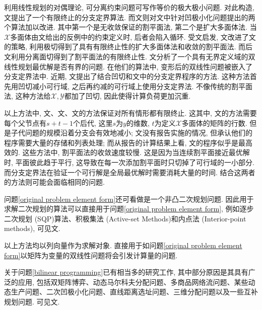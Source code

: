 \par 利用线性规划的对偶理论, 可分离约束问题可写作等价的极大极小问题. 对此构造, 文\cite{Falk1973}提出了一个有限终止的分支定界算法. 而文\cite{Gallo1977}则对文\cite{Tuy1964Concave}中针对凹极小化问题提出的两个算法加以改进. 其中第一个是无收敛保证的割平面法, 第二个是扩大多面体法. 当$\mathcal{X}$多面体由文\cite{Zwart1973Nonlinear}给出的反例中的约束定义时, 后者会陷入循环. 受文\cite{Gallo1977}启发, 文\cite{Vaish1976The,Vaish1977A}改进了文\cite{Tuy1964Concave}的策略, 利用极切得到了具有有限终止性的扩大多面体法和收敛的割平面法. 而后文\cite{Sherali1980}利用分离面切得到了割平面法的有限终止性. 文\cite{Audet1999}分析了一个具有无界定义域的双线性规划最优解是否有界的问题. 在他们的算法中, 变形后的双线性问题被嵌入了分支定界法中. 近期, 文\cite{Alarie2001COncavity}提出了结合凹切和文\cite{Audet1999}中的分支定界程序的方法. 这种方法首先用凹切减小可行域, 之后再约减的可行域上使用分支定界法. 不像传统的割平面法, 这种方法给$\mathcal{X},\mathcal{Y}$都加了凹切, 因此使得计算负荷更加沉重. 
\par 以上方法中, 文\cite{Falk1973}、文\cite{Vaish1976The}、文\cite{Sherali1980}的方法保证对所有情形都有限终止. 这其中, 文\cite{Falk1973}的方法需要每个父节点有$s+t-1$个后代, 这里$s$为$y$的维数, $t$为定义$\mathcal{X}$多面体的矩阵的行数. 但是子代问题的规模沿着分支会有效地减小; 文\cite{Vaish1976The}没有报告实施的情况, 但承认他们的程序需要大量的存储和列表处理; 而从报告的计算结果上看, 文\cite{Sherali1980}的程序似乎是最高效的. 这些方法中, 割平面法的收敛速度较慢. 这是因为当连续割平面接近最优解时, 平面彼此趋于平行, 这导致在每一次添加割平面时只切掉了可行域的一小部分. 而分支定界法在验证一个可行解是全局最优解时需要消耗大量的时间. 结合这两者的方法则可能会面临相同的问题. 
\par 问题\eqref{original problem element form}还可看做是一个非凸二次规划问题. 因此用于求解二次规划的算法可以直接用于问题\eqref{original problem element form}, 例如逐步二次规划 (SQP)算法、积极集法 (Active-set Methods)和内点法 (Interior-point methods), 可见文\cite{Nocedal2006Numerical}. 
\par 以上方法均以列向量作为求解对象. 直接用于如问题\eqref{original problem element form}以矩阵为变量的双线性问题将会引发计算量的问题.
\par 关于问题\eqref{bilinear programming}已有相当多的研究工作, 其中部分原因是其具有广泛的应用, 包括双矩阵博弈、动态马尔科夫分配问题、多商品网络流问题、某些动态生产问题、二次凹极小化问题、直线距离选址问题、三维分配问题以及一些互补规划问题. 可见文\cite{Vaish1974Nonconvex,Frieze1974A,Ibaraki1971Complementary,Konno1976Maximization,Konno1971Bilinear,Sherali1977The}.

